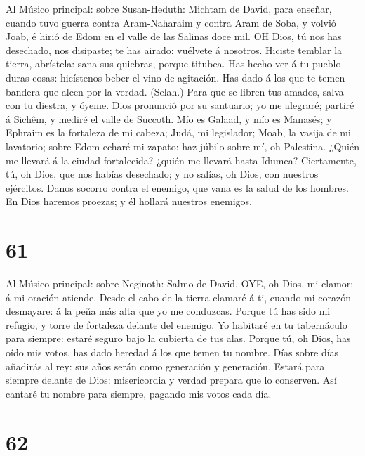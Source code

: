  Al Músico principal: sobre Susan-Heduth: Michtam de David,
para enseñar, cuando tuvo guerra contra Aram-Naharaim y contra Aram de
Soba, y volvió Joab, é hirió de Edom en el valle de las Salinas doce
mil. OH Dios, tú nos has desechado, nos disipaste; te has airado:
vuélvete á nosotros.  Hiciste temblar la tierra, abrístela:
sana sus quiebras, porque titubea.  Has hecho ver á tu
pueblo duras cosas: hicístenos beber el vino de agitación. 
Has dado á los que te temen bandera que alcen por la verdad. (Selah.)
 Para que se libren tus amados, salva con tu diestra, y
óyeme.  Dios pronunció por su santuario; yo me alegraré;
partiré á Sichêm, y mediré el valle de Succoth.  Mío es
Galaad, y mío es Manasés; y Ephraim es la fortaleza de mi cabeza; Judá,
mi legislador;  Moab, la vasija de mi lavatorio; sobre Edom
echaré mi zapato: haz júbilo sobre mí, oh Palestina.  ¿Quién
me llevará á la ciudad fortalecida? ¿quién me llevará hasta Idumea?
 Ciertamente, tú, oh Dios, que nos habías desechado; y no
salías, oh Dios, con nuestros ejércitos.  Danos socorro
contra el enemigo, que vana es la salud de los hombres.  En
Dios haremos proezas; y él hollará nuestros enemigos.

\hypertarget{section-60}{%
\section{61}\label{section-60}}

 Al Músico principal: sobre Neginoth: Salmo de David. OYE,
oh Dios, mi clamor; á mi oración atiende.  Desde el cabo de
la tierra clamaré á ti, cuando mi corazón desmayare: á la peña más alta
que yo me conduzcas.  Porque tú has sido mi refugio, y torre
de fortaleza delante del enemigo.  Yo habitaré en tu
tabernáculo para siempre: estaré seguro bajo la cubierta de tus alas.
 Porque tú, oh Dios, has oído mis votos, has dado heredad á
los que temen tu nombre.  Días sobre días añadirás al rey:
sus años serán como generación y generación.  Estará para
siempre delante de Dios: misericordia y verdad prepara que lo conserven.
 Así cantaré tu nombre para siempre, pagando mis votos cada
día.

\hypertarget{section-61}{%
\section{62}\label{section-61}}

